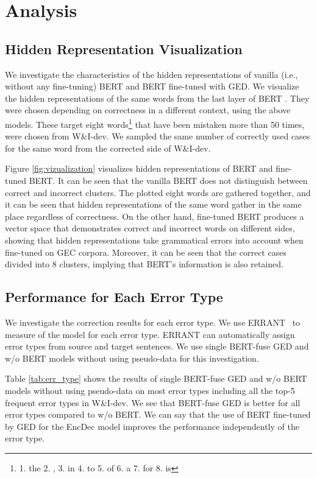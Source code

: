 \documentclass[11pt,a4paper]{article}
\begin{document}
\section{Analysis}
\subsection{Hidden Representation Visualization}
We investigate the characteristics of the hidden representations of vanilla (i.e., without any fine-tuning) BERT and BERT fine-tuned with GED.
We visualize the hidden representations of the same words from the last layer of BERT . They were chosen depending on correctness in a different context, using the above models.
These target eight words\footnote{1. the 2. , 3. in 4. to 5. of 6. a 7. for 8. is} that have been mistaken more than 50 times, were chosen from W\&I-dev.
We sampled the same number of correctly used cases for the same word from the corrected side of W\&I-dev.

Figure \ref{fig:vizualization} visualizes hidden representations of BERT and fine-tuned BERT.
It can be seen that the vanilla BERT does not distinguish between correct and incorrect clusters.
The plotted eight words are gathered together, and it can be seen that hidden representations of the same word gather in the same place regardless of correctness.
On the other hand, fine-tuned BERT produces a vector space that demonstrates correct and incorrect words on different sides, showing that hidden representations take grammatical errors into account when fine-tuned on GEC corpora.
Moreover, it can be seen that the correct cases divided into 8 clusters, implying that BERT's information is also retained.

\subsection{Performance for Each Error Type}

We investigate the correction results for each error type.
We use ERRANT~\cite{felice-etal-2016-automatic, bryant-etal-2017-automatic} to measure  of the model for each error type.
ERRANT can automatically assign error types from source and target sentences.
We use single BERT-fuse GED and w/o BERT models without using pseudo-data for this investigation.

Table \ref{tab:err_type} shows the results of single BERT-fuse GED and w/o BERT models without using pseudo-data on most error types including all the top-5 frequent error types in W\&I-dev.
We see that BERT-fuse GED is better for all error types compared to w/o BERT.
We can say that the use of BERT fine-tuned by GED for the EncDec model improves the performance independently of the error type.
\end{document}
